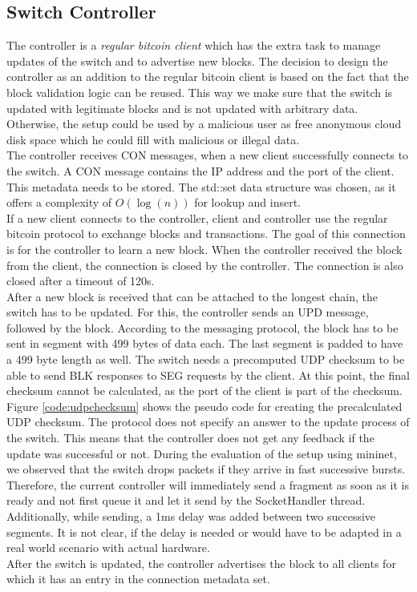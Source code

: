 \subsection{Switch Controller\label{design:SwitchController}}
The controller is a \textit{regular bitcoin client} which has the extra task to manage updates of the switch and to advertise new blocks. The decision to design the controller as an addition to the regular bitcoin client is based on the fact that the block validation logic can be reused. This way we make sure that the switch is updated with legitimate blocks and is not updated with arbitrary data. Otherwise, the setup could be used by a malicious user as free anonymous cloud disk space which he could fill with malicious or illegal data.\\
The controller receives CON messages, when a new client successfully connects to the switch. A CON message contains the IP address and the port of the client. This metadata needs to be stored. The std::set data structure was chosen, as it offers a complexity of $O(\log(n))$ for lookup and insert.\\
If a new client connects to the controller, client and controller use the regular bitcoin protocol to exchange blocks and transactions. The goal of this connection is for the controller to learn a new block. When the controller received the block from the client, the connection is closed by the controller. The connection is also closed after a timeout of 120s.\\
After a new block is received that can be attached to the longest chain, the switch has to be updated. For this, the controller sends an UPD message, followed by the block. According to the messaging protocol, the block has to be sent in segment with 499 bytes of data each. The last segment is padded to have a 499 byte length as well. The switch needs a precomputed UDP checksum to be able to send BLK responses to SEG requests by the client. At this point, the final checksum cannot be calculated, as the port of the client is part of the checksum. Figure \ref{code:udpchecksum} shows the pseudo code for creating the precalculated UDP checksum. The protocol does not specify an answer to the update process of the switch. This means that the controller does not get any feedback if the update was successful or not. During the evaluation of the setup using mininet, we observed that the switch drops packets if they arrive in fast successive bursts. Therefore, the current controller will immediately send a fragment as soon as it is ready and not first queue it and let it send by the SocketHandler thread. Additionally, while sending, a 1ms delay was added between two successive segments. It is not clear, if the delay is needed or would have to be adapted in a real world scenario with actual hardware.\\
After the switch is updated, the controller advertises the block to all clients for which it has an entry in the connection metadata set.


